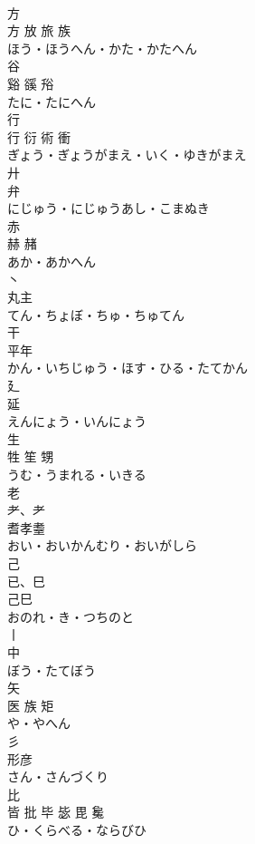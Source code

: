 \documentclass[8pt]{extreport}
\begin{document}
\begin{CJK}{UTF8}{min}
\\	方	
\\	方 放 旅 族	
\\	ほう・ほうへん・かた・かたへん	
\\	谷	
\\	谿 豀 谸	
\\	たに・たにへん	
\\	行	
\\	行 衍 術 衝	
\\	ぎょう・ぎょうがまえ・いく・ゆきがまえ	
\\	廾	
\\	弁	
\\	にじゅう・にじゅうあし・こまぬき	
\\	赤	
\\	赫 赭	
\\	あか・あかへん	
\\	丶	
\\	丸主	
\\	てん・ちょぼ・ちゅ・ちゅてん	
\\	干	
\\	平年	
\\	かん・いちじゅう・ほす・ひる・たてかん	
\\	廴	
\\	延	
\\	えんにょう・いんにょう	
\\	生	
\\	牲 笙 甥	
\\	うむ・うまれる・いきる	
\\	老	
\\	耂、⺹ 
\\	耆孝耋	
\\	おい・おいかんむり・おいがしら	
\\	己	
\\	已、巳 
\\	己巳	
\\	おのれ・き・つちのと	
\\	丨	
\\	中	
\\	ぼう・たてぼう	
\\	矢	
\\	医 族 矩	
\\	や・やへん	
\\	彡	
\\	形彦	
\\	さん・さんづくり	
\\	比	
\\	皆 批 毕 毖 毘 毚	
\\	ひ・くらべる・ならびひ	

\end{CJK}
\end{document}
